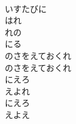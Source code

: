 \documentclass[10pt,b5j]{tarticle} %
\begin{document}
\begin{enumerate}
\begin{minipage}[c]{\blocksize}
        \vspace{\linespace}
        \item~\\
        いすたびに\\
        はれ\\
        れの\\
        にる\\
        のさをえておくれ\\
        のさをえておくれ\\
        にえろ\\
        えよれ\\
        にえろ\\
        えよえ
    
    \end{minipage}
\end{enumerate} %
\end{document}
